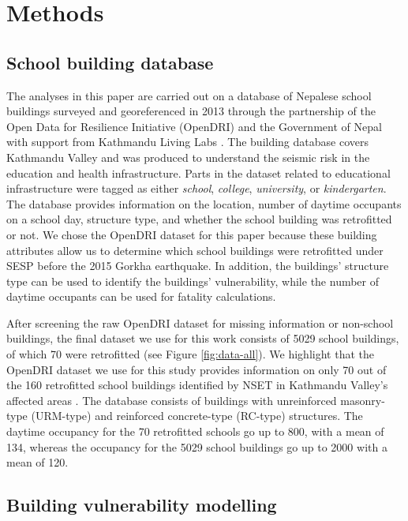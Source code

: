 \documentclass[utf8]{frontiersSCNS} %
\begin{document}
\section{Methods}
\label{section-methods}

\subsection{School building database}
The analyses in this paper are carried out on a database of Nepalese school buildings surveyed and georeferenced in 2013 through the partnership of the Open Data for Resilience Initiative (OpenDRI) and the Government of Nepal with support from Kathmandu Living Labs \citep{opendri_2012}. The building database covers Kathmandu Valley and was produced to understand the seismic risk in the education and health infrastructure. Parts in the dataset related to educational infrastructure were tagged as either \textit{school}, \textit{college}, \textit{university}, or \textit{kindergarten}. The database provides information on the location, number of daytime occupants on a school day, structure type, and whether the school building was retrofitted or not. We chose the OpenDRI dataset for this paper because these building attributes allow us to determine which school buildings were retrofitted under SESP before the 2015 Gorkha earthquake. In addition, the buildings’ structure type can be used to identify the buildings’ vulnerability, while the number of daytime occupants can be used for fatality calculations.

After screening the raw OpenDRI dataset for missing information or non-school buildings, the final dataset we use for this work consists of 5029 school buildings, of which 70 were retrofitted (see Figure \ref{fig:data-all}). We highlight that the OpenDRI dataset we use for this study provides information on only 70 out of the 160 retrofitted school buildings identified by NSET in Kathmandu Valley's affected areas \citep{marasini_2019}. The database consists of buildings with unreinforced masonry-type (URM-type) and reinforced concrete-type (RC-type) structures. The daytime occupancy for the 70 retrofitted schools go up to 800, with a mean of 134, whereas the occupancy for the 5029 school buildings go up to 2000 with a mean of 120.

\subsection{Building vulnerability modelling}
\label{section-vuln}
\end{document}
